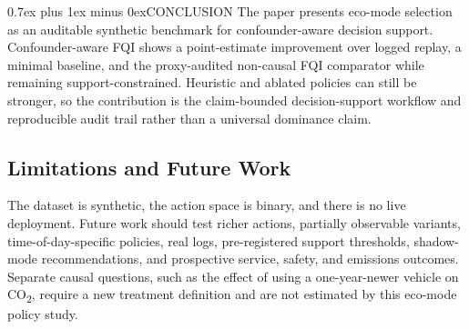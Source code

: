 \documentclass[a4paper,conference]{IEEEtran}
\makeatletter
\def\section{\@startsection{section}{1}{\z@}{1.5ex plus 1.5ex minus 0.5ex}%
  {0.7ex plus 1ex minus 0ex}{\normalfont\normalsize\centering}}
\makeatother
\begin{document}
\section{CONCLUSION}
\label{sec:conclusion}
The paper presents eco-mode selection as an auditable synthetic benchmark for confounder-aware decision support. Confounder-aware FQI shows a point-estimate improvement over logged replay, a minimal baseline, and the proxy-audited non-causal FQI comparator while remaining support-constrained. Heuristic and ablated policies can still be stronger, so the contribution is the claim-bounded decision-support workflow and reproducible audit trail rather than a universal dominance claim.

\subsection*{Limitations and Future Work}
The dataset is synthetic, the action space is binary, and there is no live deployment. Future work should test richer actions, partially observable variants, time-of-day-specific policies, real logs, pre-registered support thresholds, shadow-mode recommendations, and prospective service, safety, and emissions outcomes. Separate causal questions, such as the effect of using a one-year-newer vehicle on CO\textsubscript{2}, require a new treatment definition and are not estimated by this eco-mode policy study.
\end{document}
